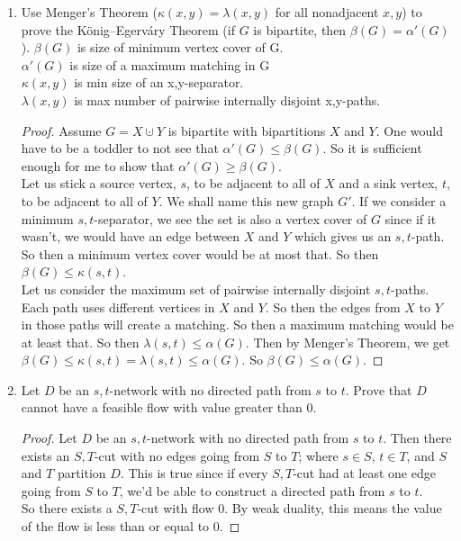 \documentclass[12pt]{article}
\begin{document}
\begin{enumerate}
\item Use Menger's Theorem ($\kappa(x,y) = \lambda(x,y)$ for all nonadjacent $x,y$) to prove the K\"onig--Egerv\'ary Theorem (if $G$ is bipartite, then $\beta(G) = \alpha'(G)$).\m
$\beta(G)$ is size of minimum vertex cover of G.\\
$\alpha'(G)$ is size of a maximum matching in G\\
$\kappa(x,y)$ is min size of an x,y-separator.\\
$\lambda(x,y)$ is max number of pairwise internally disjoint x,y-paths.
\begin{proof}
	Assume $G = X \cupdot Y$ is bipartite with bipartitions $X$ and $Y$. One would have to be a toddler to not see that $\alpha'(G)\leq\beta(G)$. So it is sufficient enough for me to show that $\alpha'(G)\geq\beta(G)$.\\
	Let us stick a source vertex, $s$, to be adjacent to all of $X$ and a sink vertex, $t$, to be adjacent to all of $Y$. We shall name this new graph $G'$. If we consider a minimum $s,t$-separator, we see the set is also a vertex cover of $G$ since if it wasn't, we would have an edge between $X$ and $Y$ which gives us an $s,t$-path. So then a minimum vertex cover would be at most that. So then $\beta(G)\leq\kappa(s,t)$.\\
	Let us consider the maximum set of pairwise internally disjoint $s,t$-paths. Each path uses different vertices in $X$ and $Y$. So then the edges from $X$ to $Y$ in those paths will create a matching. So then a maximum matching would be at least that. So then $\lambda(s,t)\leq\alpha(G)$.
	Then by Menger's Theorem, we get $\beta(G)\leq\kappa(s,t) = \lambda(s,t)\leq\alpha(G)$. So $\beta(G)\leq\alpha(G)$.
\end{proof}


\medskip
\item Let $D$ be an $s,t$-network with no directed path from $s$ to $t$. Prove that $D$ cannot have a feasible flow with value greater than 0. 
\begin{proof}
	Let $D$ be an $s,t$-network with no directed path from $s$ to $t$. Then there exists an $S,T$-cut with no edges going from $S$ to $T$; where $s\in S$, $t\in T$, and $S$ and $T$ partition $D$. This is true since if every $S,T$-cut had at least one edge going from $S$ to $T$, we'd be able to construct a directed path from $s$ to $t$.\\
	So there exists a $S,T$-cut with flow 0. By weak duality, this means the value of the flow is less than or equal to 0.
\end{proof}


\end{enumerate}
\end{document}
